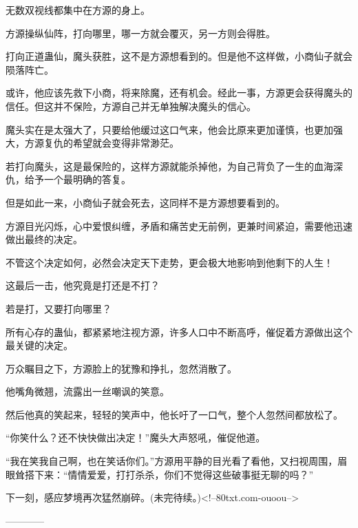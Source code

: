 \begin{this_body}
无数双视线都集中在方源的身上。

方源操纵仙阵，打向哪里，哪一方就会覆灭，另一方则会得胜。

打向正道蛊仙，魔头获胜，这不是方源想看到的。但是他不这样做，小商仙子就会陨落阵亡。

或许，他应该先救下小商，将来除魔，还有机会。经此一事，方源更会获得魔头的信任。但这并不保险，方源自己并无单独解决魔头的信心。

魔头实在是太强大了，只要给他缓过这口气来，他会比原来更加谨慎，也更加强大，方源复仇的希望就会变得非常渺茫。

若打向魔头，这是最保险的，这样方源就能杀掉他，为自己背负了一生的血海深仇，给予一个最明确的答复。

但是如此一来，小商仙子就会死去，这同样不是方源想要看到的。

方源目光闪烁，心中爱恨纠缠，矛盾和痛苦史无前例，更兼时间紧迫，需要他迅速做出最终的决定。

不管这个决定如何，必然会决定天下走势，更会极大地影响到他剩下的人生！

这最后一击，他究竟是打还是不打？

若是打，又要打向哪里？

所有心存的蛊仙，都紧紧地注视方源，许多人口中不断高呼，催促着方源做出这个最关键的决定。

万众瞩目之下，方源脸上的犹豫和挣扎，忽然消散了。

他嘴角微翘，流露出一丝嘲讽的笑意。

然后他真的笑起来，轻轻的笑声中，他长吁了一口气，整个人忽然间都放松了。

“你笑什么？还不快快做出决定！”魔头大声怒吼，催促他道。

“我在笑我自己啊，也在笑话你们。”方源用平静的目光看了看他，又扫视周围，眉眼耸搭下来：“情情爱爱，打打杀杀，你们不觉得这些破事挺无聊的吗？”

下一刻，感应梦境再次猛然崩碎。(未完待续。)<!--80txt.com-ouoou-->

------------

\end{this_body}

